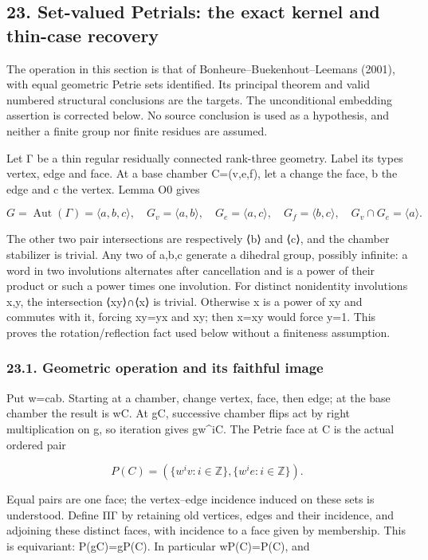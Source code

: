 \documentclass[
  10pt,
  letterpaper,
]{article}
\begin{document}
\subsection{23. Set-valued Petrials: the exact kernel and thin-case
recovery}\label{set-valued-petrials-the-exact-kernel-and-thin-case-recovery}

The operation in this section is that of Bonheure--Buekenhout--Leemans
(2001), with equal geometric Petrie sets identified. Its principal
theorem and valid numbered structural conclusions are the targets. The
unconditional embedding assertion is corrected below. No source
conclusion is used as a hypothesis, and neither a finite group nor
finite residues are assumed.

Let Γ be a thin regular residually connected rank-three geometry. Label
its types vertex, edge and face. At a base chamber C=(v,e,f), let a
change the face, b the edge and c the vertex. Lemma O0 gives

\[
 G=\operatorname{Aut}(\Gamma)=\langle a,b,c\rangle,
 \quad G_v=\langle a,b\rangle,\quad G_e=\langle a,c\rangle,
 \quad G_f=\langle b,c\rangle,\quad G_v\cap G_e=\langle a\rangle.
 \tag{P1}
\]

The other two pair intersections are respectively ⟨b⟩ and ⟨c⟩, and the
chamber stabilizer is trivial. Any two of a,b,c generate a dihedral
group, possibly infinite: a word in two involutions alternates after
cancellation and is a power of their product or such a power times one
involution. For distinct nonidentity involutions x,y, the intersection
⟨xy⟩∩⟨x⟩ is trivial. Otherwise x is a power of xy and commutes with it,
forcing xy=yx and \textbar xy; then x=xy would force y=1. This
proves the rotation/reflection fact used below without a finiteness
assumption.

\subsubsection{23.1. Geometric operation and its faithful
image}\label{geometric-operation-and-its-faithful-image}

Put w=cab. Starting at a chamber, change vertex, face, then edge; at the
base chamber the result is wC. At gC, successive chamber flips act by
right multiplication on g, so iteration gives gw\^{}iC. The Petrie face
at C is the actual ordered pair

\[
 P(C)=\left(\{w^iv:i\in\mathbb Z\},\{w^ie:i\in\mathbb Z\}\right).
 \tag{P2}
\]

Equal pairs are one face; the vertex--edge incidence induced on these
sets is understood. Define ΠΓ by retaining old vertices, edges and their
incidence, and adjoining these distinct faces, with incidence to a face
given by membership. This is equivariant: P(gC)=gP(C). In particular
wP(C)=P(C), and
\end{document}
